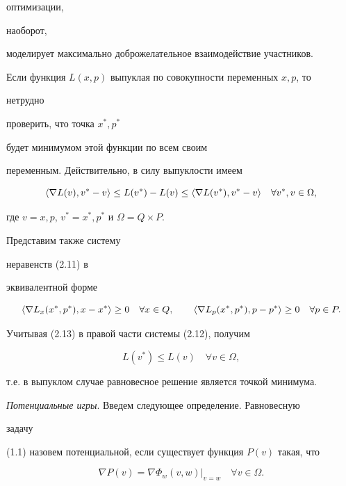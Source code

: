 оптимизации,


наоборот,


моделирует максимально доброжелательное взаимодействие участников.





Если функция $L(x,p)$ выпуклая по совокупности переменных $x,p$, то


нетрудно


проверить, что точка $x^*,p^*$


будет минимумом этой функции по всем своим


переменным. Действительно, в силу выпуклости имеем


\begin{equation}


\la\nabla L(v),v^*-v\ra\le L(v^*)-L(v)\le


\la\nabla L(v^*),v^*-v\ra\quad\forall v^*,v\in\Omega,


\end{equation}


где $v=x,p$, $v^*=x^*,p^*$ и $\Omega=Q\times P$.


Представим также систему


неравенств (2.11) в


эквивалентной форме


\begin{equation}


\la\nabla L_x(x^*,p^*),x-x^*\ra\ge 0\quad \forall x\in Q,\qquad


\la\nabla L_p(x^*,p^*),p-p^*\ra\ge 0\quad \forall p\in P.


\end{equation}


Учитывая (2.13) в правой части системы (2.12), получим


$$


L(v^*)\le L(v)\quad \forall v\in \Omega,


$$


т.е. в выпуклом случае равновесное решение является точкой минимума.


\medskip





{\it Потенциальные игры}. Введем следующее определение. Равновесную


задачу


(1.1) назовем потенциальной, если существует функция $P(v)$ такая, что


\begin{equation}


\nabla P(v)=\nabla\Phi_w(v,w)|_{v=w}\quad \forall v\in \Omega.


\end{equation}



